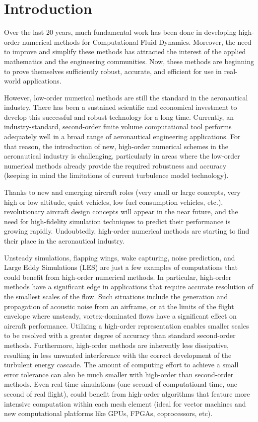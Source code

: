 
\section{Introduction}

Over the last 20 years, much fundamental work has been done in developing high-order numerical methods for Computational Fluid Dynamics. Moreover, the need to improve and simplify these methods has attracted the interest of the applied mathematics and the engineering communities. Now, these methods are beginning to prove themselves sufficiently robust, accurate, and efficient for use in real-world applications.

However, low-order numerical methods are still the standard in the aeronautical industry. There has been a sustained scientific and economical investment to develop this successful and robust technology for a long time. Currently, an industry-standard, second-order finite volume computational tool performs adequately well in a broad range of aeronautical engineering applications. For that reason, the introduction of new, high-order numerical schemes in the aeronautical industry is challenging, particularly in areas where the low-order numerical methods already provide the required robustness and accuracy (keeping in mind the limitations of current turbulence model technology).

Thanks to new and emerging aircraft roles (very small or large concepts, very high or low altitude, quiet vehicles, low fuel consumption vehicles, etc.), revolutionary aircraft design concepts will appear in the near future, and the need for high-fidelity simulation techniques to predict their performance is growing rapidly. Undoubtedly, high-order numerical methods are starting to find their place in the aeronautical industry. 

Unsteady simulations, flapping wings, wake capturing, noise prediction, and Large Eddy Simulations (LES) are just a few examples of computations that could benefit from high-order numerical methods. In particular, high-order methods have a significant edge in applications that require accurate resolution of the smallest scales of the flow. Such situations include the generation and propagation of acoustic noise from an airframe, or at the limits of the flight envelope where unsteady, vortex-dominated flows have a significant effect on aircraft performance. Utilizing a high-order representation enables smaller scales to be resolved with a greater degree of accuracy than standard second-order methods. Furthermore, high-order methods are inherently less dissipative, resulting in less unwanted interference with the correct development of the turbulent energy cascade. The amount of computing effort to achieve a small error tolerance can also be much smaller with high-order than second-order methods. Even real time simulations (one second of computational time, one second of real flight), could benefit from high-order algorithms that feature more intensive computation within each mesh element (ideal for vector machines and new computational platforms like GPUs, FPGAs, coprocessors, etc).

